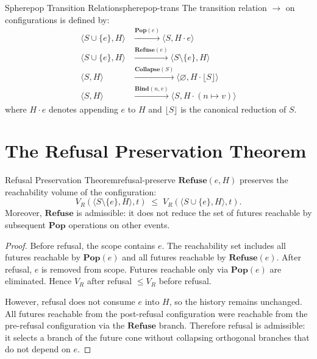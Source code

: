 \documentclass[12pt,twoside,openright]{book}
\begin{document}
\begin{definition}{Spherepop Transition Relation}{spherepop-trans}
  The transition relation $\to$ on configurations is
  defined by:
  \begin{align*}
    \langle S \cup \{e\}, H \rangle
    &\xrightarrow{\mathbf{Pop}(e)}
    \langle S, H \cdot e \rangle \\
    \langle S \cup \{e\}, H \rangle
    &\xrightarrow{\mathbf{Refuse}(e)}
    \langle S \setminus \{e\}, H \rangle \\
    \langle S, H \rangle
    &\xrightarrow{\mathbf{Collapse}(S)}
    \langle \varnothing, H \cdot \lfloor S \rfloor \rangle \\
    \langle S, H \rangle
    &\xrightarrow{\mathbf{Bind}(n,v)}
    \langle S, H \cdot (n \mapsto v) \rangle
  \end{align*}
  where $H \cdot e$ denotes appending $e$ to $H$ and
  $\lfloor S \rfloor$ is the canonical reduction of $S$.
\end{definition}

\section{The Refusal Preservation Theorem}

\begin{theorem}{Refusal Preservation Theorem}{refusal-preserve}
  $\mathbf{Refuse}(e, H)$ preserves the reachability
  volume of the configuration:
  \[
    V_R(\langle S \setminus \{e\}, H \rangle, t)
    \;\le\;
    V_R(\langle S \cup \{e\}, H \rangle, t).
  \]
  Moreover, $\mathbf{Refuse}$ is admissible: it does not
  reduce the set of futures reachable by subsequent
  $\mathbf{Pop}$ operations on other
  events.
\end{theorem}

\begin{proof}
  Before refusal, the scope contains $e$.
  The reachability set includes all futures reachable
  by $\mathbf{Pop}(e)$ and all futures reachable by
  $\mathbf{Refuse}(e)$.
  After refusal, $e$ is removed from scope.
  Futures reachable only via $\mathbf{Pop}(e)$ are
  eliminated.
  Hence $V_R$ after refusal $\le V_R$ before refusal.

  However, refusal does not consume $e$ into $H$,
  so the history remains unchanged.
  All futures reachable from the post-refusal configuration
  were reachable from the pre-refusal configuration
  via the $\mathbf{Refuse}$ branch.
  Therefore refusal is admissible: it selects a branch
  of the future cone without collapsing orthogonal branches
  that do not depend on $e$.
\end{proof}
\end{document}
